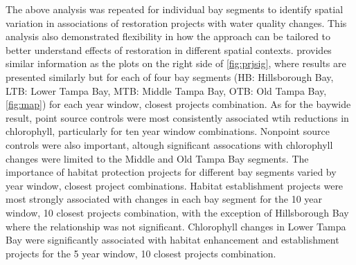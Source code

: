 \documentclass[]{article}
\begin{document}
The above analysis was repeated for individual bay segments to identify
spatial variation in associations of restoration projects with water
quality changes. This analysis also demonstrated flexibility in how the
approach can be tailored to better understand effects of restoration in
different spatial contexts.  provides similar
information as the plots on the right side of \cref{fig:prjsig}, where
results are presented similarly but for each of four bay segments (HB:
Hillsborough Bay, LTB: Lower Tampa Bay, MTB: Middle Tampa Bay, OTB: Old
Tampa Bay, \cref{fig:map}) for each year window, closest projects
combination. As for the baywide result, point source controls were most
consistently associated wtih reductions in chlorophyll, particularly for
ten year window combinations. Nonpoint source controls were also
important, altough significant assocations with chlorophyll changes were
limited to the Middle and Old Tampa Bay segments. The importance of
habitat protection projects for different bay segments varied by year
window, closest project combinations. Habitat establishment projects
were most strongly associated with changes in each bay segment for the
10 year window, 10 closest projects combination, with the exception of
Hillsborough Bay where the relationship was not significant. Chlorophyll
changes in Lower Tampa Bay were significantly associated with habitat
enhancement and establishment projects for the 5 year window, 10 closest
projects combination.
\end{document}
